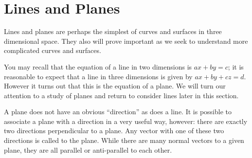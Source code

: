\section{Lines and Planes}\label{sec:3Dlinesplanes}

Lines and planes are perhaps the simplest of curves and surfaces in
three dimensional space. They also will prove important as we seek to
understand more complicated curves and surfaces. 

You may recall that the equation of a line in two dimensions is $ax+by=c$; it is
reasonable to expect that a line in three dimensions is
given by $ax + by +cz = d$. However it turns out that
this is the equation of a plane. We will turn our attention to a study of planes and return to consider lines later in this section. 

A plane does not have an obvious ``direction'' as does a line. It is
possible to associate a plane with a direction in a very useful way,
however: there are exactly two directions perpendicular to a
plane. Any vector with one of these two directions is called  to the plane.
While there are many normal vectors to a given plane, they are all
parallel or anti-parallel to each other.

